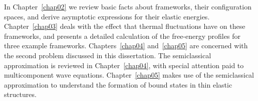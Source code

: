 In Chapter~\ref{chap02} we review basic facts about frameworks, their configuration spaces, and derive asymptotic expressions for their elastic energies.
Chapter~\ref{chap03} deals with the effect that thermal fluctuations have on these frameworks, and presents a detailed calculation of the free-energy profiles for three example frameworks.
Chapters~\ref{chap04} and~\ref{chap05} are concerned with the second problem discussed in this dissertation.
The semiclassical approximation is reviewed in Chapter~\ref{chap04}, with special attention paid to multicomponent wave equations.
Chapter~\ref{chap05} makes use of the semiclassical approximation to understand the formation of bound states in thin elastic structures.
